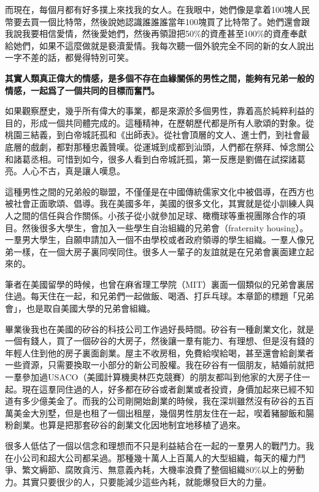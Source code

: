 而現在，每個月都有好多撲上來找我的女人。在我眼中，她們像是拿着100塊人民幣要去買一個比特幣，然後說她認識誰誰誰當年100塊買了比特幣了。她們還會跟我說我要相信愛情，然後愛她們，然後再領證把50\%的資產甚至100\%的資產奉獻給她們，如果不這麼做就是褻瀆愛情。我每次聽一個外貌完全不同的新的女人說出一字不差的話，都覺得特別可笑。

\textbf{其實人類真正偉大的情感，是多個不存在血緣關係的男性之間，能夠有兄弟一般的情感，一起爲了一個共同的目標而奮鬥。}

如果觀察歷史，幾乎所有偉大的事業，都是來源於多個男性，靠着高於純粹利益的目的，形成一個共同體完成的。這種精神，在歷朝歷代都是所有人歌頌的對象。從桃園三結義，到白帝城託孤和《出師表》。從社會頂層的文人、進士們，到社會最底層的戲劇，都對那種忠義贊嘆。從運城到成都到汕頭，人們都在祭拜、悼念關公和諸葛丞相。可惜到如今，很多人看到白帝城託孤，第一反應是劉備在試探諸葛亮。人心不古，真是讓人嘆息。

這種男性之間的兄弟般的聯盟，不僅僅是在中國傳統儒家文化中被倡導，在西方也被社會正面歌頌、倡導。我在美國多年，美國的很多文化，其實就是從小訓練人與人之間的信任與合作關係。小孩子從小就參加足球、橄欖球等重視團隊合作的項目。然後很多大學生，會加入一些學生自治組織的兄弟會（fraternity housing）。一羣男大學生，自願申請加入一個不由學校或者政府領導的學生組織。一羣人像兄弟一樣，在一個大房子裏同喫同住。很多人一輩子的友誼就是在兄弟會裏面建立起來的。

筆者在美國留學的時候，也曾在麻省理工學院（MIT）裏面一個類似的兄弟會裏居住過。每天住在一起，和兄弟們一起做飯、喝酒、打乒乓球。本章節的標題「兄弟會」，也是取自美國大學的兄弟會組織。

畢業後我也在美國的矽谷的科技公司工作過好長時間。矽谷有一種創業文化，就是一個有錢人，買了一個矽谷的大房子，然後讓一羣有能力、有理想、但是沒有錢的年輕人住到他的房子裏面創業。屋主不收房租，免費給喫給喝，甚至還會給創業者一些資源，只需要換取一小部分的新公司股權。我在矽谷有一個朋友，結婚前就把一羣參加過USACO（美國計算機奧林匹克競賽）的朋友都叫到他家的大房子住一起。現在這羣同住過的人，好多都在矽谷或者創業或者投資，身價加起來已經不知道有多少億美金了。而我的公司剛開始創業的時候，我在深圳雖然沒有矽谷的五百萬美金大別墅，但是也租了一個出租屋，幾個男性朋友住在一起，喫着豬腳飯和腸粉創業。也算是把那套矽谷的創業文化因地制宜地移植了過來。

很多人低估了一個以信念和理想而不只是利益結合在一起的一羣男人的戰鬥力。我在小公司和超大公司都呆過。那種幾十萬人上百萬人的大型組織，每天的權力鬥爭、繁文縟節、腐敗貪污、無意義內耗，大機率浪費了整個組織80\%以上的勞動力。其實只要很少的人，只要能減少這些內耗，就能爆發巨大的力量。

